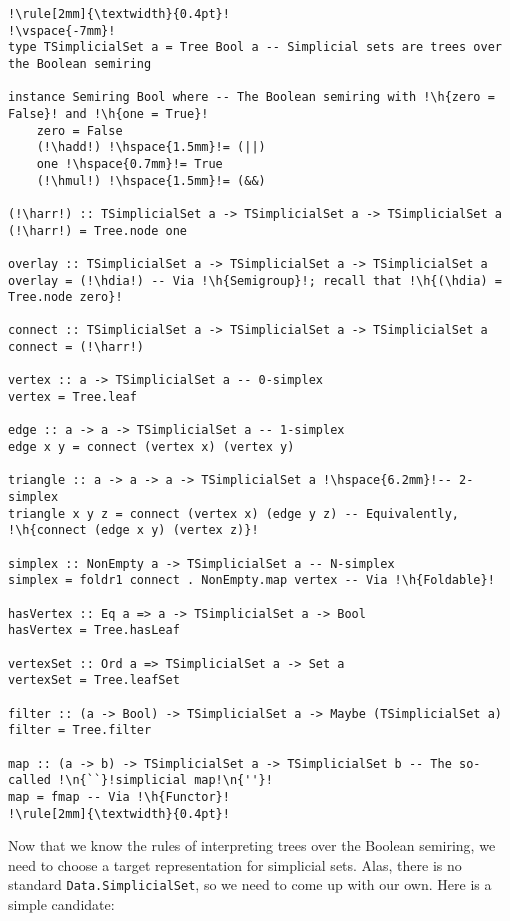 \documentclass[english,submission]{programming}
\newcommand{\code}[1]{\lstinline[mathescape]|#1|}
\newcommand{\h}[1]{{\itshape\color{grayblue}#1}} %
\newcommand{\n}[1]{{\itshape\color{graygreen}#1}} %
\newcommand{\hadd}{{\large\color{darkblue} $\oplus$}}
\newcommand{\hmul}{{\large\color{darkblue} $\otimes$}}
\newcommand{\hdia}{\,\text{\raisebox{-0.2mm}{\Large\color{darkblue} $\diamond$}}\,}
\newcommand{\harr}{\,\text{\color{darkblue} $\rightarrow$}\,}
\begin{document}
\begin{lstlisting}[float,label=lst-simplicial-set,xleftmargin=0pt,caption={
    A basic API for working with simplicial sets represented by trees.
}]
!\rule[2mm]{\textwidth}{0.4pt}!
!\vspace{-7mm}!
type TSimplicialSet a = Tree Bool a -- Simplicial sets are trees over the Boolean semiring

instance Semiring Bool where -- The Boolean semiring with !\h{zero = False}! and !\h{one = True}!
    zero = False
    (!\hadd!) !\hspace{1.5mm}!= (||)
    one !\hspace{0.7mm}!= True
    (!\hmul!) !\hspace{1.5mm}!= (&&)

(!\harr!) :: TSimplicialSet a -> TSimplicialSet a -> TSimplicialSet a
(!\harr!) = Tree.node one

overlay :: TSimplicialSet a -> TSimplicialSet a -> TSimplicialSet a
overlay = (!\hdia!) -- Via !\h{Semigroup}!; recall that !\h{(\hdia) = Tree.node zero}!

connect :: TSimplicialSet a -> TSimplicialSet a -> TSimplicialSet a
connect = (!\harr!)

vertex :: a -> TSimplicialSet a -- 0-simplex
vertex = Tree.leaf

edge :: a -> a -> TSimplicialSet a -- 1-simplex
edge x y = connect (vertex x) (vertex y)

triangle :: a -> a -> a -> TSimplicialSet a !\hspace{6.2mm}!-- 2-simplex
triangle x y z = connect (vertex x) (edge y z) -- Equivalently, !\h{connect (edge x y) (vertex z)}!

simplex :: NonEmpty a -> TSimplicialSet a -- N-simplex
simplex = foldr1 connect . NonEmpty.map vertex -- Via !\h{Foldable}!

hasVertex :: Eq a => a -> TSimplicialSet a -> Bool
hasVertex = Tree.hasLeaf

vertexSet :: Ord a => TSimplicialSet a -> Set a
vertexSet = Tree.leafSet

filter :: (a -> Bool) -> TSimplicialSet a -> Maybe (TSimplicialSet a)
filter = Tree.filter

map :: (a -> b) -> TSimplicialSet a -> TSimplicialSet b -- The so-called !\n{``}!simplicial map!\n{''}!
map = fmap -- Via !\h{Functor}!
!\rule[2mm]{\textwidth}{0.4pt}!
\end{lstlisting}

\noindent
Now that we know the rules of interpreting trees over the Boolean semiring, we
need to choose a target representation for simplicial sets. Alas, there is no
standard \code{Data.SimplicialS}\code{et}, so we need to come up with our own.
Here is a simple candidate:
\end{document}
